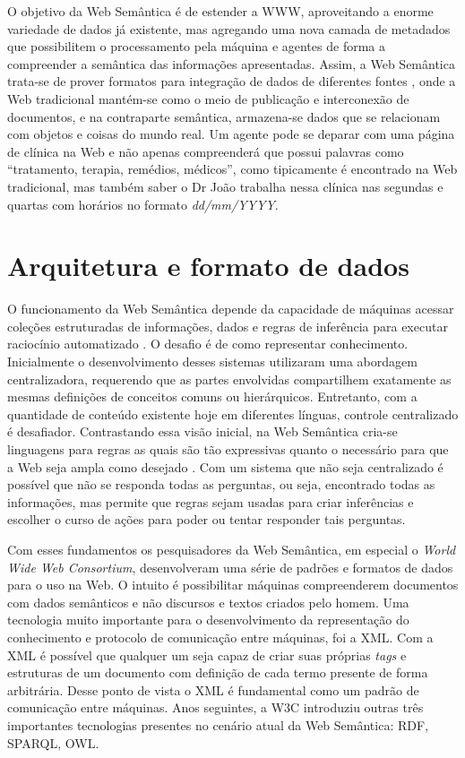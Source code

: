 O objetivo da Web Semântica é de estender a WWW, aproveitando a enorme variedade de dados já existente, mas agregando uma nova camada de metadados que possibilitem o processamento pela máquina e agentes de forma a compreender a semântica das informações apresentadas. Assim, a Web Semântica trata-se de prover formatos para integração de dados de diferentes fontes \citep{SemanticWebW3C}, onde a Web tradicional mantém-se como o meio de publicação e interconexão de documentos, e na contraparte semântica, armazena-se dados que se relacionam com objetos e coisas do mundo real. Um agente pode se deparar com uma página de clínica na Web e não apenas compreenderá que possui palavras como “tratamento, terapia, remédios, médicos”, como tipicamente é encontrado na Web tradicional, mas também saber o Dr João trabalha nessa clínica nas segundas e quartas com horários no formato \textit{dd/mm/YYYY}.

\section{Arquitetura e formato de dados}

O funcionamento da Web Semântica depende da capacidade de máquinas acessar coleções estruturadas de informações, dados e regras de inferência para executar raciocínio automatizado \citep{bernerslee2001semantic}. O desafio é de como representar conhecimento. Inicialmente o desenvolvimento desses sistemas utilizaram uma abordagem centralizadora, requerendo que as partes envolvidas compartilhem exatamente as mesmas definições de conceitos comuns ou hierárquicos. Entretanto, com a quantidade de conteúdo existente hoje em diferentes línguas, controle centralizado é desafiador. Contrastando essa visão inicial, na Web Semântica cria-se linguagens para regras as quais são tão expressivas quanto o necessário para que a Web seja ampla como desejado \citep{bernerslee2001semantic}. Com um sistema que não seja centralizado é possível que não se responda todas as perguntas, ou seja, encontrado todas as informações, mas permite que regras sejam usadas para criar inferências e escolher o curso de ações para poder ou tentar responder tais perguntas.

Com esses fundamentos os pesquisadores da Web Semântica, em especial o \textit{World Wide Web Consortium}, desenvolveram uma série de padrões e formatos de dados para o uso na Web. O intuito é possibilitar máquinas compreenderem documentos com dados semânticos e não discursos e textos criados pelo homem. Uma tecnologia muito importante para o desenvolvimento da representação do conhecimento e protocolo de comunicação entre máquinas, foi a \ac{XML}. Com a XML é possível que qualquer um seja capaz de criar suas próprias \textit{tags} e estruturas de um documento com definição de cada termo presente de forma arbitrária. Desse ponto de vista o XML é fundamental como um padrão de comunicação entre máquinas. Anos seguintes, a W3C introduziu outras três importantes tecnologias presentes no cenário atual da Web Semântica: \ac{RDF}, \ac{SPARQL}, \ac{OWL}.

